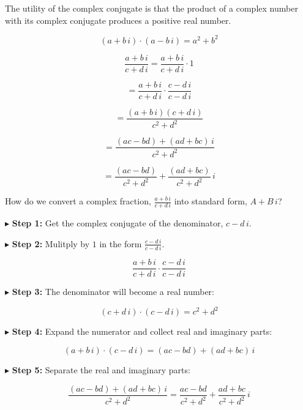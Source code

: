 \documentclass{ximera}
\begin{document}
The utility of the complex conjugate is that the product of a complex number with its complex conjugate produces a positive real number.



\begin{observation}

\[
(a + b \, i) \cdot (a - b \, i) = a^2 + b^2
\]

\end{observation}






\[
\frac{a + b \, i}{c + d \, i} = \frac{a + b \, i}{c + d \, i}  \cdot 1 
\]

\[
= \frac{a + b \, i}{c + d \, i} \cdot \frac{c - d \, i}{c - d \, i} 
\]

\[
= \frac{(a + b \, i)(c + d \, i)}{c^2 + d^2} 
\]

\[
= \frac{(ac - bd) + (ad + bc) \, i}{c^2 + d^2} 
\]

\[
= \frac{(ac - bd)}{c^2 + d^2}  + \frac{(ad + bc)}{c^2 + d^2} \, i
\]







\begin{procedure}


How do we convert a complex fraction, $\frac{a + b \, i}{c + d \, i}$ into standard form, $A + B \, i$?



$\blacktriangleright$ \textbf{Step 1:}   Get the complex conjugate of the denominator, $c - d \, i$.


$\blacktriangleright$ \textbf{Step 2:} Mulitply by $1$ in the form $\frac{c - d \, i}{c - d \, i}$.

\[
\frac{a + b \, i}{c + d \, i} \cdot \frac{c - d \, i}{c - d \, i}
\]

$\blacktriangleright$ \textbf{Step 3:}  The denominator will become a real number:  

\[ (c + d \, i) \cdot (c - d \, i) = c^2 + d^2 \]



$\blacktriangleright$ \textbf{Step 4:}  Expand the numerator and collect real and imaginary parts: 

\[ (a + b \, i) \cdot (c - d \, i) = (ac-bd) + (ad + bc) \, i \]


$\blacktriangleright$ \textbf{Step 5:} Separate the real and imaginary parts: 

\[
\frac{(ac-bd) + (ad + bc) \, i}{c^2 + d^2} = \frac{ac - bd}{c^2 + d^2} + \frac{ad + bc}{c^2 + d^2} \, i
\] 



\end{procedure}
\end{document}
